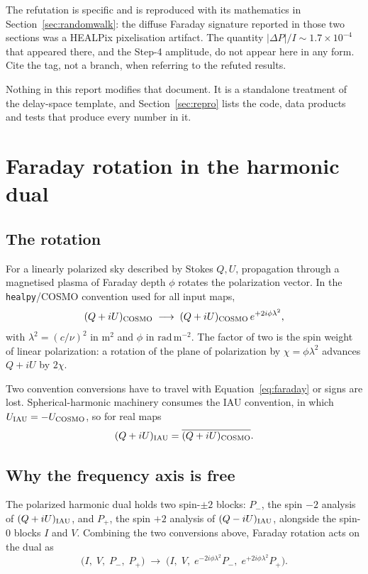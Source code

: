 \documentclass[11pt]{article}
\newcommand{\rmu}{\ensuremath{\mathrm{rad\,m^{-2}}}}
\newcommand{\lamsq}{\ensuremath{\lambda^{2}}}
\newcommand{\code}[1]{\texttt{#1}}
\begin{document}
The refutation is specific and is reproduced with its mathematics in
Section~\ref{sec:randomwalk}: the diffuse Faraday signature reported in
those two sections was a HEALPix pixelisation artifact. The quantity
$|\Delta P|/I \sim 1.7\times10^{-4}$ that appeared there, and the Step-4
amplitude, do not appear here in any form. Cite the tag, not a branch,
when referring to the refuted results.

Nothing in this report modifies that document. It is a standalone
treatment of the delay-space template, and Section~\ref{sec:repro} lists
the code, data products and tests that produce every number in it.

\section{Faraday rotation in the harmonic dual}
\label{sec:dual}

\subsection{The rotation}

For a linearly polarized sky described by Stokes $Q,U$, propagation
through a magnetised plasma of Faraday depth $\phi$ rotates the
polarization vector. In the \code{healpy}/COSMO convention used for all
input maps,
\begin{equation}
  (Q + iU)_{\rm COSMO} \;\longrightarrow\; (Q + iU)_{\rm COSMO}\,
  e^{+2i\phi\lamsq},
  \label{eq:faraday}
\end{equation}
with $\lamsq = (c/\nu)^2$ in $\mathrm{m^2}$ and $\phi$ in \rmu. The
factor of two is the spin weight of linear polarization: a rotation of
the plane of polarization by $\chi = \phi\lamsq$ advances $Q+iU$ by
$2\chi$.

Two convention conversions have to travel with
Equation~\eqref{eq:faraday} or signs are lost. Spherical-harmonic
machinery consumes the IAU convention, in which $U_{\rm IAU} = -U_{\rm
COSMO}$, so for real maps
\begin{equation}
  (Q+iU)_{\rm IAU} = \overline{(Q+iU)_{\rm COSMO}} .
\end{equation}

\subsection{Why the frequency axis is free}

The polarized harmonic dual holds two spin-$\pm2$ blocks: $P_{-}$, the
spin $-2$ analysis of $(Q+iU)_{\rm IAU}$, and $P_{+}$, the spin $+2$
analysis of $(Q-iU)_{\rm IAU}$, alongside the spin-0 blocks $I$ and $V$.
Combining the two conversions above, Faraday rotation acts on the dual as
\begin{equation}
  \bigl(I,\;V,\;P_{-},\;P_{+}\bigr) \;\longrightarrow\;
  \bigl(I,\;V,\;e^{-2i\phi\lamsq}P_{-},\;e^{+2i\phi\lamsq}P_{+}\bigr).
  \label{eq:dualblock}
\end{equation}
\end{document}

